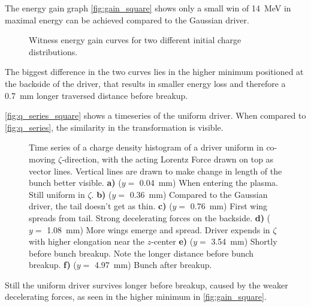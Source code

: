\documentclass[bachelor_thesis]{subfiles}
\begin{document}
The energy gain graph \autoref{fig:gain_square} shows only a small win of \qty{14}{\MeV} in maximal energy can be achieved compared to the Gaussian driver.
\begin{figure}
	\centering
	
	\caption{Witness energy gain curves for two different initial charge distributions.}
	\label{fig:gain_square}
\end{figure}
The biggest difference in the two curves lies in the higher minimum positioned at the backside of the driver, that results in smaller energy loss and therefore a \qty{0.7}{mm} longer traversed distance before breakup.

\autoref{fig:q_series_square} shows a timeseries of the uniform driver. When compared to \autoref{fig:q_series}, the similarity in the transformation is visible.
\begin{figure}
	\centering
	
	\caption{Time series of a charge density histogram of a driver uniform in co-moving $\zeta$-direction, with the acting Lorentz Force drawn on top as vector lines. Vertical lines are drawn to make change in length of the bunch better visible. 
	\textbf{a)} ($y=$ \qty{0.04}{mm}) When entering the plasma. Still uniform in $\zeta$.
	\textbf{b)} ($y=$ \qty{0.36}{mm}) Compared to the Gaussian driver, the tail doesn't get as thin.
	\textbf{c)} ($y=$ \qty{0.76}{mm}) First wing spreads from tail. Strong decelerating forces on the backside.
	\textbf{d)} ($y=$ \qty{1.08}{mm}) More wings emerge and spread. Driver expends in $\zeta$ with higher elongation near the $z$-center
	\textbf{e)} ($y=$ \qty{3.54}{mm}) Shortly before bunch breakup. Note the longer distance before bunch breakup.
	\textbf{f)} ($y=$ \qty{4.97}{mm}) Bunch after breakup.}
	\label{fig:q_series_square}
\end{figure}
Still the uniform driver survives longer before breakup, caused by the weaker decelerating forces, as seen in the higher minimum in \autoref{fig:gain_square}.
\end{document}
